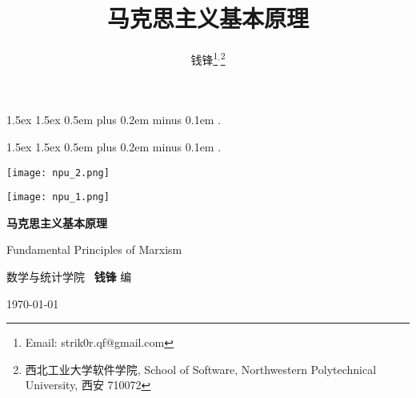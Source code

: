 \documentclass[10pt, UTF8]{book} %
\title{\textbf{马克思主义基本原理}}
\author{钱锋\thanks{Email: strik0r.qf@gmail.com}${}^,$\thanks{
    西北工业大学软件学院, School of Software, Northwestern Polytechnical University, 西安 710072
}}
\begin{document}
    {1.5ex}                                         %
    {1.5ex}                                         %
    {}                                              %
    {}                                              %
    {\bfseries}                                     %
    {}                                              %
    {0.5em plus 0.2em minus 0.1em}                  %
    {.}

\theoremstyle{mytheoremstyle} \newtheorem{example}{例}[section]
\theoremstyle{mytheoremstyle} \newtheorem{key}{核心要点}[section]

\theoremstyle{plain} \newtheorem{thm}{分析论述}

    {1.5ex}                                         %
    {1.5ex}                                         %
    {}                                              %
    {}                                              %
    {\kaishu}                                       %
    {}                                              %
    {0.5em plus 0.2em minus 0.1em}                  %
    {.}

\theoremstyle{my3theoremstyle}
\newtheorem*{remark}{注}
\newtheorem*{sol}{答案要点}
\newtheorem*{cmt}{评注}

\pagestyle{empty}
\begin{titlepage}
    \thispagestyle{empty}
    \centering
        \vspace*{2cm}
        \texttt{[image: npu\_2.png]}\par
        \vspace{1em}
        \texttt{[image: npu\_1.png]}\par
    \vspace{1em}
        \begin{center}
            \Huge \heiti \textbf{马克思主义基本原理}

            Fundamental Principles of Marxism
        \end{center}
        \vspace{16em}
        \begin{center}
        \songti
        \kaishu 数学与统计学院 \, \heiti\textbf{钱锋} \quad \songti 编
        \vspace{0.5em}

    \today
    \end{center}
\end{titlepage}
\end{document}
